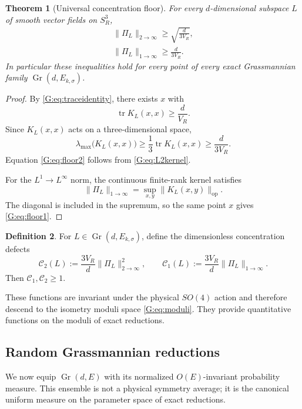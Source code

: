 \documentclass[
 aps,
 prd,
 reprint,
 amsmath,
 amssymb,
 nofootinbib,
 superscriptaddress
]{revtex4-2}
\newtheorem{theorem}{Theorem}[section]
\theoremstyle{definition}
\newtheorem{definition}[theorem]{Definition}
\theoremstyle{remark}
\newcommand{\Sthree}{S^3_R}
\newcommand{\Gr}{\operatorname{Gr}}
\newcommand{\tr}{\operatorname{tr}}
\newcommand{\op}{\mathrm{op}}
\begin{document}
\begin{theorem}[Universal concentration floor]
\label{G:thm:concentrationfloor}
For every $d$-dimensional subspace $L$ of smooth vector fields on $\Sthree$,
\begin{align}
 \boxed{
 \|\Pi_L\|_{2\to\infty}
 \ge
 \sqrt{\frac{d}{3V_R}},
 }
 \label{G:eq:floor2}\\
 \boxed{
 \|\Pi_L\|_{1\to\infty}
 \ge
 \frac{d}{3V_R}.
 }
 \label{G:eq:floor1}
\end{align}
In particular these inequalities hold for every point of every exact
Grassmannian family $\Gr(d,E_{k,\sigma})$.
\end{theorem}

\begin{proof}
By \eqref{G:eq:traceidentity}, there exists $x$ with
\[
       \tr K_L(x,x)\ge\frac{d}{V_R}.
\]
Since $K_L(x,x)$ acts on a three-dimensional space,
\[
 \lambda_{\max}\bigl(K_L(x,x)\bigr)
 \ge
 \frac13\tr K_L(x,x)
 \ge
 \frac{d}{3V_R}.
\]
Equation \eqref{G:eq:floor2} follows from \eqref{G:eq:L2kernel}.

For the $L^1\to L^\infty$ norm, the continuous finite-rank kernel satisfies
\[
 \|\Pi_L\|_{1\to\infty}
 =
 \sup_{x,y}\|K_L(x,y)\|_{\op}.
\]
The diagonal is included in the supremum, so the same point $x$ gives
\eqref{G:eq:floor1}.
\end{proof}

\begin{definition}
For $L\in\Gr(d,E_{k,\sigma})$, define the dimensionless concentration
defects
\begin{equation}
 \mathcal C_2(L)
 :=
 \frac{3V_R}{d}\|\Pi_L\|_{2\to\infty}^2,
 \qquad
 \mathcal C_1(L)
 :=
 \frac{3V_R}{d}\|\Pi_L\|_{1\to\infty}.
 \label{G:eq:defects}
\end{equation}
Then $\mathcal C_1,\mathcal C_2\ge1$.
\end{definition}

These functions are invariant under the physical $SO(4)$ action and
therefore descend to the isometry moduli space \eqref{G:eq:moduli}.  They
provide quantitative functions on the moduli of exact reductions.

\subsection{Random Grassmannian reductions}

We now equip $\Gr(d,E)$ with its normalized $O(E)$-invariant probability
measure.  This ensemble is not a physical symmetry average; it is the
canonical uniform measure on the parameter space of exact reductions.
\end{document}
